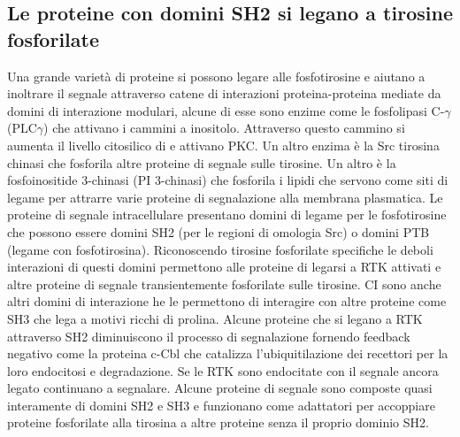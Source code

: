 \subsection{Le proteine con domini SH2 si legano a tirosine fosforilate}
Una grande variet\`a di proteine si possono legare alle fosfotirosine e aiutano a inoltrare il segnale attraverso catene di interazioni proteina-proteina mediate da domini di interazione
modulari, alcune di esse sono enzime come le fosfolipasi C-$\gamma$ (PLC$\gamma$) che attivano i cammini a inositolo. Attraverso questo cammino si aumenta il livello citosilico di 
 e attivano PKC. Un altro enzima \`e la Src tirosina chinasi che fosforila altre proteine di segnale sulle tirosine. Un altro \`e la fosfoinositide 3-chinasi (PI 3-chinasi)
che fosforila i lipidi che servono come siti di legame per attrarre varie proteine di segnalazione alla membrana plasmatica. Le proteine di segnale intracellulare presentano domini
di legame per le fosfotirosine che possono essere domini SH2 (per le regioni di omologia Src) o domini PTB (legame con fosfotirosina). Riconoscendo tirosine fosforilate specifiche 
le deboli interazioni di questi domini permettono alle proteine di legarsi a RTK attivati e altre proteine di segnale transientemente fosforilate sulle tirosine. CI sono anche altri 
domini di interazione he le permettono di interagire con altre proteine come SH3 che lega a motivi ricchi di prolina. Alcune proteine che si legano a RTK attraverso SH2 diminuiscono il
processo di segnalazione fornendo feedback negativo come la proteina c-Cbl che catalizza l'ubiquitilazione dei recettori per la loro endocitosi e degradazione. Se le RTK sono
endocitate con il segnale ancora legato continuano a segnalare. Alcune proteine di segnale sono composte quasi interamente di domini SH2 e SH3 e funzionano come adattatori per accoppiare
proteine fosforilate alla tirosina a altre proteine senza il proprio dominio SH2. 
